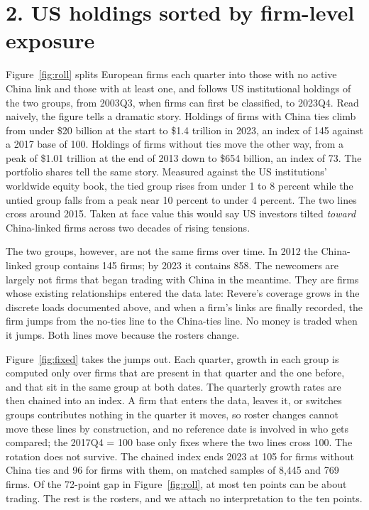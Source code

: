 \documentclass[11pt]{article}
\begin{document}
\section*{2. US holdings sorted by firm-level exposure}

Figure~\ref{fig:roll} splits European firms each quarter into those with no
active China link and those with at least one, and follows US institutional
holdings of the two groups, from 2003Q3, when firms can first be classified, to
2023Q4. Read naively, the figure tells a dramatic story.
Holdings of firms with China ties climb from under \$20 billion at the start to
\$1.4 trillion in 2023, an index of 145 against a 2017 base of 100. Holdings of
firms without ties move the other way, from a peak of \$1.01 trillion at the end
of 2013 down to \$654 billion, an index of 73. The portfolio shares tell the same
story. Measured against the US institutions' worldwide equity book, the tied group
rises from under 1 to 8 percent while the untied group falls from a peak near 10
percent to under 4 percent. The two lines cross around 2015. Taken at face value this would say US investors tilted
\emph{toward} China-linked firms across two decades of rising tensions.

The two groups, however, are not the same firms over time. In 2012 the
China-linked group contains 145 firms; by 2023 it contains 858. The newcomers
are largely not firms that began trading with China in the meantime. They are
firms whose existing relationships entered the data late: Revere's coverage
grows in the discrete loads documented above, and when a firm's links are
finally recorded, the firm jumps from the no-ties line to the China-ties line.
No money is traded when it jumps. Both lines move because the rosters change.

Figure~\ref{fig:fixed} takes the jumps out. Each quarter, growth in each group
is computed only over firms that are present in that quarter and the one
before, and that sit in the same group at both dates. The quarterly growth
rates are then chained into an index. A firm that enters the data, leaves it,
or switches groups contributes nothing in the quarter it moves, so roster
changes cannot move these lines by construction, and no reference date is
involved in who gets compared; the 2017Q4 = 100 base only fixes where the two
lines cross 100. The rotation does not survive. The chained index ends 2023 at
105 for firms without China ties and 96 for firms with them, on matched
samples of 8,445 and 769 firms. Of the 72-point gap in Figure~\ref{fig:roll},
at most ten points can be about trading. The rest is the rosters, and we
attach no interpretation to the ten points.
\end{document}
